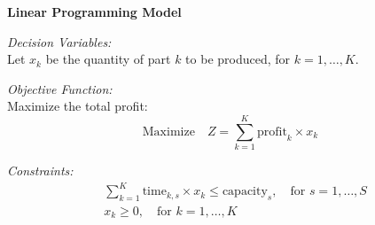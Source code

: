 \documentclass{article}
\begin{document}
\noindent \textbf{Linear Programming Model}

\bigskip

\noindent \textit{Decision Variables:}\\
Let \( x_k \) be the quantity of part \( k \) to be produced, for \( k = 1, \ldots, K \).

\bigskip

\noindent \textit{Objective Function:}\\
Maximize the total profit:
\[
\text{Maximize} \quad Z = \sum_{k=1}^{K} \text{profit}_k \times x_k
\]

\bigskip

\noindent \textit{Constraints:}
\begin{align*}
& \sum_{k=1}^{K} \text{time}_{k, s} \times x_k \leq \text{capacity}_s, \quad \text{for } s = 1, \ldots, S \\
& x_k \geq 0, \quad \text{for } k = 1, \ldots, K 
\end{align*}
\end{document}

